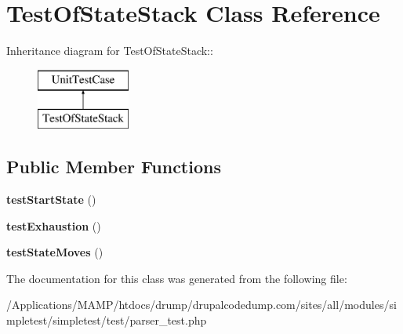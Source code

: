\hypertarget{class_test_of_state_stack}{
\section{TestOfStateStack Class Reference}
\label{class_test_of_state_stack}
}
Inheritance diagram for TestOfStateStack::\begin{figure}[H]
\begin{center}
\leavevmode
\includegraphics[height=2cm]{class_test_of_state_stack}
\end{center}
\end{figure}
\subsection*{Public Member Functions}
\begin{DoxyCompactItemize}
\item 
\hypertarget{class_test_of_state_stack_a2bb9977fd3389a738f483a8bc9a04aab}{
{\bfseries testStartState} ()}
\label{class_test_of_state_stack_a2bb9977fd3389a738f483a8bc9a04aab}

\item 
\hypertarget{class_test_of_state_stack_afd15b855e20b6ad0874a8c9b4db10274}{
{\bfseries testExhaustion} ()}
\label{class_test_of_state_stack_afd15b855e20b6ad0874a8c9b4db10274}

\item 
\hypertarget{class_test_of_state_stack_a4b56d9f8acd0183231737b1323dbcc5c}{
{\bfseries testStateMoves} ()}
\label{class_test_of_state_stack_a4b56d9f8acd0183231737b1323dbcc5c}

\end{DoxyCompactItemize}


The documentation for this class was generated from the following file:\begin{DoxyCompactItemize}
\item 
/Applications/MAMP/htdocs/drump/drupalcodedump.com/sites/all/modules/simpletest/simpletest/test/parser\_\-test.php\end{DoxyCompactItemize}
